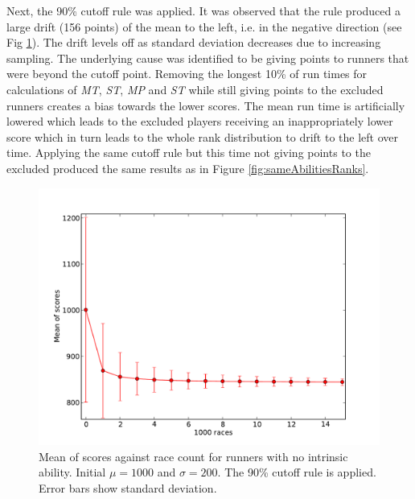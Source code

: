 Next, the 90\% cutoff rule was applied. It was observed that the rule produced a large drift (156 points) of the mean to the left, i.e. in the negative direction (see Fig \ref{fig:meanDrift}). The drift levels off as standard deviation decreases due to increasing sampling. The underlying cause was identified to be giving points to runners that were beyond the cutoff point. Removing the longest 10\% of run times for calculations of \emph{MT}, \emph{ST}, \emph{MP} and \emph{ST} while still giving points to the excluded runners creates a bias towards the lower scores. The mean run time is artificially lowered which leads to the excluded players receiving an inappropriately lower score which in turn leads to the whole rank distribution to drift to the left over time. Applying the same cutoff rule but this time not giving points to the excluded produced the same results as in Figure \ref{fig:sameAbilitiesRanks}.
\begin{figure}[h]     
    \begin{center}                        
        \includegraphics[width=15cm]{./images/meanDrift.pdf}
	\end{center}
	\caption{Mean of scores against race count for runners with no intrinsic ability. Initial $\mu=1000$ and $\sigma=200$. The 90\% cutoff rule is applied. Error bars show standard deviation.}
	\label{fig:meanDrift}
\end{figure}\\
